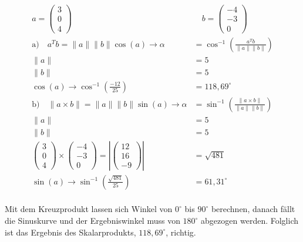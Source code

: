 \documentclass[a4paper]{article}
\begin{document}
  \subsection{}
    \begin{align*}
      a =
      \begin{pmatrix}
        3 \\ 0 \\ 4
      \end{pmatrix}
      &\quad
      b =
      \begin{pmatrix}
        -4 \\ -3 \\ 0
      \end{pmatrix}
      \\[1em]
      \text{a)}\quad a^Tb = \|a\|\|b\|\cos{(a)}\rightarrow \alpha &= \cos^{-1} (\frac{a^Tb}{\|a\|\|b\|}) \\[1em]
      \|a\| &= 5 \\[1em]
      \|b\| &= 5 \\[1em]
      \cos{(a)} \rightarrow \cos^{-1}(\frac{-12}{25}) &= 118,69^\circ
      \\[1em]
      \text{b)}\quad \|a \times b\| = \|a\|\|b\|\sin{(a)}\rightarrow \alpha &= \sin^{-1} (\frac{\|a \times b\|}{\|a\|\|b\|}) \\[1em]
      \|a\| &= 5 \\[1em]
      \|b\| &= 5 \\[1em]
      \begin{pmatrix}
        3 \\ 0 \\ 4
      \end{pmatrix}
      \times
      \begin{pmatrix}
        -4 \\ -3 \\ 0
      \end{pmatrix}
      =
      \left|\begin{pmatrix}
        12 \\ 16 \\ -9
      \end{pmatrix}\right|
      &= \sqrt{481}
      \\[1em]
      \sin{(a)} \rightarrow \sin^{-1}(\frac{\sqrt{481}}{25}) &= 61,31^\circ
    \end{align*}
    \\[1em]
    Mit dem Kreuzprodukt lassen sich Winkel von $0^\circ$ bis $90^\circ$ berechnen, danach fällt die Sinuskurve und der Ergebniswinkel muss von $180^\circ$ abgezogen werden. Folglich ist das Ergebnis des Skalarprodukts, $118,69^\circ$, richtig.
\end{document}
